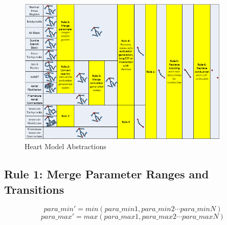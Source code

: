 \begin{figure}[!t]
		\centering
		\includegraphics[width=0.9\textwidth]{figs/rule.png}
		\caption{\small Heart Model Abstractions}
		\label{fig:abs}
\end{figure}



\subsection{Rule 1: Merge Parameter Ranges and Transitions}
 $$para\_min'=min(para\_min1,para\_min2\cdots para\_minN)$$ 
$$para\_max'=max(para\_max1,para\_max2\cdots para\_maxN)$$

